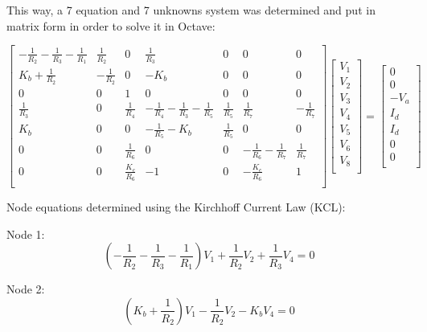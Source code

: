 This way, a 7 equation and 7 unknowns system was determined and put in matrix form in order to solve it in Octave: \vspace{4mm}

$
\begin{bmatrix}
   -\frac{1}{R_2}-\frac{1}{R_3}-\frac{1}{R_1} & \frac{1}{R_2} & 0 & \frac{1}{R_3} & 0 & 0 & 0 \\
   K_b+\frac{1}{R_2} & -\frac{1}{R_2} & 0 & -K_b & 0 & 0 & 0 \\ 
   0 & 0 & 1 & 0 & 0 & 0 & 0 \\
   \frac{1}{R_3} & 0 & \frac{1}{R_4} & -\frac{1}{R_4}-\frac{1}{R_3}-\frac{1}{R_5} &  \frac{1}{R_5} & \frac{1}{R_7} & -\frac{1}{R_7} \\
   K_b & 0 & 0 & -\frac{1}{R_5}-K_b & \frac{1}{R_5} & 0 & 0 \\
   0 & 0 &\frac{1}{R_6} & 0 & 0 & -\frac{1}{R_6}-\frac{1}{R_7} & \frac{1}{R_7} \\
   0 & 0 & \frac{K_c}{R_6} & -1 & 0 & -\frac{K_c}{R_6} & 1 \\
\end{bmatrix}
\begin{bmatrix}
   V_1 \\
   V_2 \\
   V_3 \\
   V_4 \\
   V_5 \\
   V_6 \\
   V_8 \\
\end{bmatrix}
=
\begin{bmatrix}
   0 \\
   0 \\
   -V_a \\ 
   I_d \\
   I_d \\
   0 \\
   0 \\
\end{bmatrix}
$
\vspace{5mm}

Node equations determined using the Kirchhoff Current Law (KCL): \vspace{2mm}

Node 1:
\begin{equation}
  (-\frac{1}{R_2}-\frac{1}{R_3}-\frac{1}{R_1})V_1 + \frac{1}{R_2}V_2 + \frac{1}{R_3}V_4 = 0
  \label{eq:node1}
\end{equation}

Node 2:
\begin{equation}
  (K_b+\frac{1}{R_2})V_1 - \frac{1}{R_2}V_2 - K_bV_4 = 0
  \label{eq:node2}
\end{equation}

